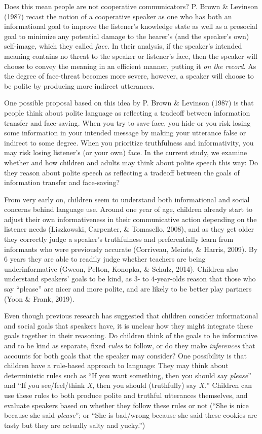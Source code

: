 \documentclass[oneside]{report}
\begin{document}
Does this mean people are not cooperative communicators? P. Brown \&
Levinson (1987) recast the notion of a cooperative speaker as one who
has both an informational goal to improve the listener's knowledge state
as well as a prosocial goal to minimize any potential damage to the
hearer's (and the speaker's own) self-image, which they called
\emph{face.} In their analysis, if the speaker's intended meaning
contains no threat to the speaker or listener's face, then the speaker
will choose to convey the meaning in an efficient manner, putting it
\emph{on the record}. As the degree of face-threat becomes more severe,
however, a speaker will choose to be polite by producing more indirect
utterances.

One possible proposal based on this idea by P. Brown \& Levinson (1987)
is that people think about polite language as reflecting a tradeoff
between information transfer and face-saving. When you try to save face,
you hide or you risk losing some information in your intended message by
making your utterance false or indirect to some degree. When you
prioritize truthfulness and informativity, you may risk losing
listener's (or your own) face. In the current study, we examine whether
and how children and adults may think about polite speech this way: Do
they reason about polite speech as reflecting a tradeoff between the
goals of information transfer and face-saving?

From very early on, children seem to understand both informational and
social concerns behind language use. Around one year of age, children
already start to adjust their own informativeness in their communicative
action depending on the listener needs (Liszkowski, Carpenter, \&
Tomasello, 2008), and as they get older they correctly judge a speaker's
truthfulness and preferentially learn from informants who were
previously accurate (Corriveau, Meints, \& Harris, 2009). By 6 years
they are able to readily judge whether teachers are being
underinformative (Gweon, Pelton, Konopka, \& Schulz, 2014). Children
also understand speakers' goals to be kind, as 3- to 4-year-olds reason
that those who say ``please'' are nicer and more polite, and are likely
to be better play partners (Yoon \& Frank, 2019).

Even though previous research has suggested that children consider
informational and social goals that speakers have, it is unclear how
they might integrate these goals together in their reasoning. Do
children think of the goals to be informative and to be kind as
separate, fixed \emph{rules} to follow, or do they make
\emph{inferences} that accounts for both goals that the speaker may
consider? One possibility is that children have a rule-based approach to
language: They may think about deterministic rules such as ``If you want
something, then you should say \emph{please}'' and ``If you
see/feel/think \emph{X}, then you should (truthfully) say \emph{X.}''
Children can use these rules to both produce polite and truthful
utterances themselves, and evaluate speakers based on whether they
follow these rules or not (``She is nice because she said
\emph{please}''; or ``She is bad/wrong because she said these cookies
are tasty but they are actually salty and yucky.'')
\end{document}
